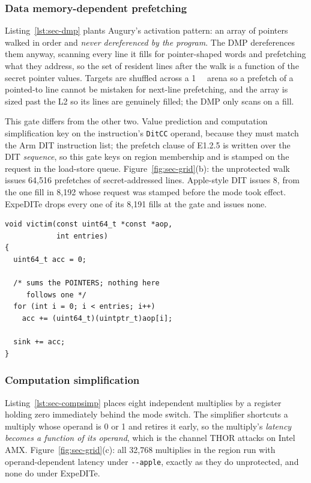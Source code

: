 \subsubsection{Data memory-dependent prefetching}\label{sec:eval:dmp}

Listing~\ref{lst:sec-dmp} plants Augury's activation pattern: an array of
pointers walked in order and \emph{never dereferenced by the program}. The DMP
dereferences them anyway, scanning every line it fills for pointer-shaped words
and prefetching what they address, so the set of resident lines after the walk
is a function of the secret pointer values. Targets are shuffled across a
\SI{1}{\mebi\byte} arena so a prefetch of a pointed-to line cannot be mistaken
for next-line prefetching, and the array is sized past the L2 so its lines are
genuinely filled; the DMP only scans on a fill.

This gate differs from the other two. Value prediction and computation
simplification key on the instruction's \texttt{DitCC} operand, because they
must match the Arm DIT instruction list; the prefetch clause of
E1.2.5 is written over the DIT \emph{sequence}, so this gate keys on region
membership and is stamped on the request in the load-store queue.
Figure~\ref{fig:sec-grid}(b): the unprotected walk issues 64{,}516 prefetches of
secret-addressed lines. Apple-style DIT issues 8, from the one fill in
8{,}192 whose request was stamped before the mode took effect. ExpeDITe drops
every one of its 8{,}191 fills at the gate and issues none.

\begin{lstlisting}[float=t, caption={The DMP microbenchmark. An array of secret
pointers is summed, never followed; every fetch of a pointed-to line is the
prefetcher's doing.}, label=lst:sec-dmp]
void victim(const uint64_t *const *aop,
            int entries)
{
  uint64_t acc = 0;

  /* sums the POINTERS; nothing here
     follows one */
  for (int i = 0; i < entries; i++)
    acc += (uint64_t)(uintptr_t)aop[i];

  sink += acc;
}
\end{lstlisting}

\subsubsection{Computation simplification}\label{sec:eval:compsimp}

Listing~\ref{lst:sec-compsimp} places eight independent multiplies by a register
holding zero immediately behind the mode switch. The simplifier shortcuts a
multiply whose operand is 0 or 1 and retires it early, so the multiply's
\emph{latency becomes a function of its operand}, which is the channel THOR
attacks on Intel AMX. Figure~\ref{fig:sec-grid}(c): all 32{,}768 multiplies in
the region run with operand-dependent latency under \texttt{-{}-apple}, exactly
as they do unprotected, and none do under ExpeDITe.

